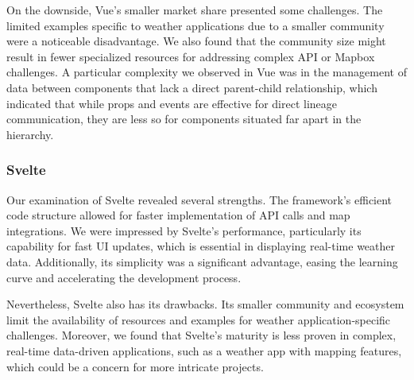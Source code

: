 On the downside, Vue's smaller market share presented some challenges. The limited examples specific to weather applications due to a smaller community were a noticeable disadvantage. We also found that the community size might result in fewer specialized resources for addressing complex API or Mapbox challenges. A particular complexity we observed in Vue was in the management of data between components that lack a direct parent-child relationship, which indicated that while props and events are effective for direct lineage communication, they are less so for components situated far apart in the hierarchy.

\subsubsection{Svelte}

Our examination of Svelte revealed several strengths. The framework's efficient code structure allowed for faster implementation of API calls and map integrations. We were impressed by Svelte's performance, particularly its capability for fast UI updates, which is essential in displaying real-time weather data. Additionally, its simplicity was a significant advantage, easing the learning curve and accelerating the development process.

Nevertheless, Svelte also has its drawbacks. Its smaller community and ecosystem limit the availability of resources and examples for weather application-specific challenges. Moreover, we found that Svelte's maturity is less proven in complex, real-time data-driven applications, such as a weather app with mapping features, which could be a concern for more intricate projects.